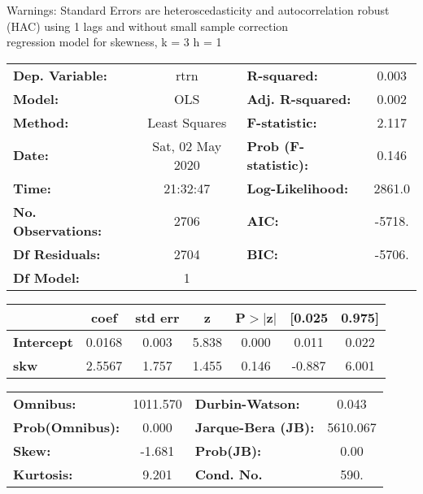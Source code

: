 Warnings: \newline
 [1] Standard Errors are heteroscedasticity and autocorrelation robust (HAC) using 1 lags and without small sample correction\\ 

regression model for skewness, k = 3 h = 1\begin{center}
\begin{tabular}{lclc}
\toprule
\textbf{Dep. Variable:}    &       rtrn       & \textbf{  R-squared:         } &     0.003   \\
\textbf{Model:}            &       OLS        & \textbf{  Adj. R-squared:    } &     0.002   \\
\textbf{Method:}           &  Least Squares   & \textbf{  F-statistic:       } &     2.117   \\
\textbf{Date:}             & Sat, 02 May 2020 & \textbf{  Prob (F-statistic):} &    0.146    \\
\textbf{Time:}             &     21:32:47     & \textbf{  Log-Likelihood:    } &    2861.0   \\
\textbf{No. Observations:} &        2706      & \textbf{  AIC:               } &    -5718.   \\
\textbf{Df Residuals:}     &        2704      & \textbf{  BIC:               } &    -5706.   \\
\textbf{Df Model:}         &           1      & \textbf{                     } &             \\
\bottomrule
\end{tabular}
\begin{tabular}{lcccccc}
                   & \textbf{coef} & \textbf{std err} & \textbf{z} & \textbf{P$> |$z$|$} & \textbf{[0.025} & \textbf{0.975]}  \\
\midrule
\textbf{Intercept} &       0.0168  &        0.003     &     5.838  &         0.000        &        0.011    &        0.022     \\
\textbf{skw}       &       2.5567  &        1.757     &     1.455  &         0.146        &       -0.887    &        6.001     \\
\bottomrule
\end{tabular}
\begin{tabular}{lclc}
\textbf{Omnibus:}       & 1011.570 & \textbf{  Durbin-Watson:     } &    0.043  \\
\textbf{Prob(Omnibus):} &   0.000  & \textbf{  Jarque-Bera (JB):  } & 5610.067  \\
\textbf{Skew:}          &  -1.681  & \textbf{  Prob(JB):          } &     0.00  \\
\textbf{Kurtosis:}      &   9.201  & \textbf{  Cond. No.          } &     590.  \\
\bottomrule
\end{tabular}
\end{center}

